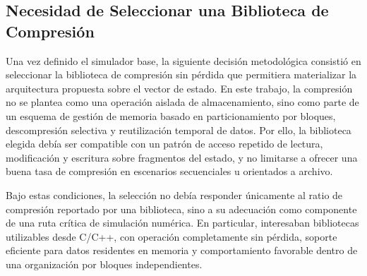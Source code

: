 \subsection{Necesidad de Seleccionar una Biblioteca de Compresión}

Una vez definido el simulador base, la siguiente decisión metodológica consistió en
seleccionar la biblioteca de compresión sin pérdida que permitiera materializar la
arquitectura propuesta sobre el vector de estado. En este trabajo, la compresión no se
plantea como una operación aislada de almacenamiento, sino como parte de un esquema
de gestión de memoria basado en particionamiento por bloques, descompresión selectiva
y reutilización temporal de datos. Por ello, la biblioteca elegida debía ser compatible con
un patrón de acceso repetido de lectura, modificación y escritura sobre fragmentos del
estado, y no limitarse a ofrecer una buena tasa de compresión en escenarios
secuenciales u orientados a archivo.

Bajo estas condiciones, la selección no debía responder únicamente al ratio de
compresión reportado por una biblioteca, sino a su adecuación como componente de una
ruta crítica de simulación numérica. En particular, interesaban bibliotecas utilizables
desde C/C++, con operación completamente sin pérdida, soporte eficiente para datos
residentes en memoria y comportamiento favorable dentro de una organización por
bloques independientes.
